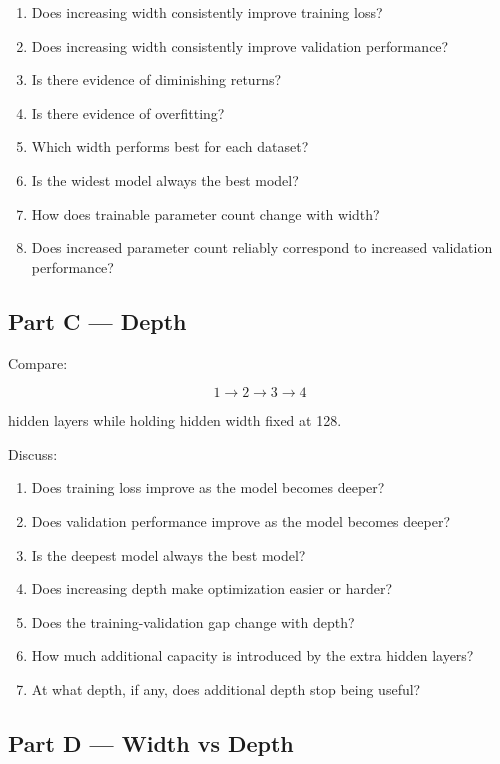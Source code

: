 \documentclass[11pt,a4paper]{article}
\begin{document}
\begin{enumerate}
    \item Does increasing width consistently improve training loss?
    \item Does increasing width consistently improve validation performance?
    \item Is there evidence of diminishing returns?
    \item Is there evidence of overfitting?
    \item Which width performs best for each dataset?
    \item Is the widest model always the best model?
    \item How does trainable parameter count change with width?
    \item Does increased parameter count reliably correspond to increased validation performance?
\end{enumerate}

\subsection*{Part C --- Depth}

Compare:

\[
1\rightarrow2\rightarrow3\rightarrow4
\]

hidden layers while holding hidden width fixed at 128.

Discuss:

\begin{enumerate}
    \item Does training loss improve as the model becomes deeper?
    \item Does validation performance improve as the model becomes deeper?
    \item Is the deepest model always the best model?
    \item Does increasing depth make optimization easier or harder?
    \item Does the training-validation gap change with depth?
    \item How much additional capacity is introduced by the extra hidden layers?
    \item At what depth, if any, does additional depth stop being useful?
\end{enumerate}

\subsection*{Part D --- Width vs Depth}
\end{document}
